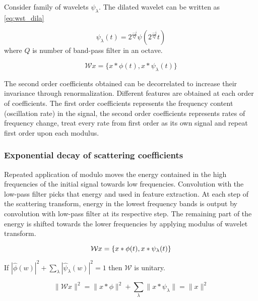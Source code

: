 Consider family of wavelets ${\psi_{\lambda}}$. The dilated wavelet can be written as \ref{eq:wst_dila}

\begin{equation} \label{eq:wst_dila}
    \psi_{\lambda}(t) = 2^{\frac{-j}{Q}}\psi(2^{\frac{-j}{Q}}t)
\end{equation}
where $Q$ is number of band-pass filter in an octave.

\begin{equation} \label{eq:wst_wt}
    \mathcal{W} x = \{x\ast \phi(t) , x\ast \psi_\lambda(t) \}
\end{equation}

The second order coefficients obtained can be decorrelated to increase their invariance through renormalization. Different features are obtained at each order of coefficients. The first order coefficients represents the frequency content (oscillation rate) in the signal, the second order coefficients represents rates of frequency change, treat every rate from first order as its own signal and repeat first order upon each modulus. 

 \subsubsection{Exponential decay of scattering coefficients}
 Repeated application of modulo moves the energy contained in the high frequencies of the initial signal towards low frequencies. Convolution with the low-pass filter picks that energy and used in  feature extraction. At each step of the scattering transform, energy in the lowest frequency bands is output by convolution with low-pass filter at its respective step. The remaining part of the energy  is shifted towards the lower frequencies by applying modulus of wavelet transform.
 
 \begin{equation} \label{eq:wst_wt1}
    \mathcal{W} x = \{x\ast \phi(t) , x\ast \psi_\lambda(t) \} \\
\end{equation}

If $|\hat{\phi}(w)|^2 + \sum_{\lambda} | \hat{\psi}_{\lambda}(w)|^2 = 1$ then $\mathcal{W}$ is unitary.

\begin{equation}    
    \|\mathcal{W}x\|^2 = \|x\ast\phi\|^2 + \sum_{\lambda}\| x \ast \psi_\lambda\| = \|x\|^2
\end{equation}

